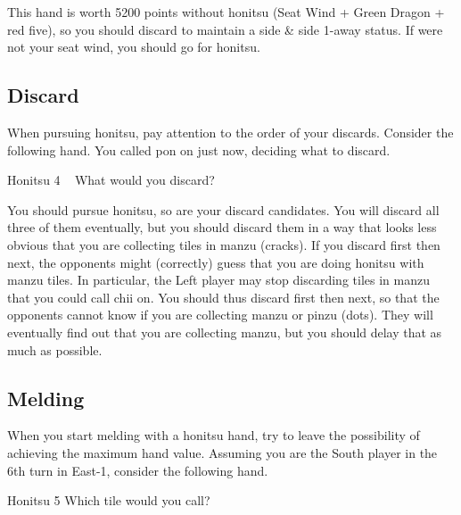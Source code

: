 \bigskip
\noindent This hand is worth 5200 points without {\jap honitsu} (Seat Wind + Green Dragon + red five), so you should discard {\LARGE{}} to maintain a side \& side 1-away status. If {\LARGE\nan} were not your seat wind, you should go for {\jap honitsu}.

\newpage
\subsection{Discard}
When pursuing {\jap honitsu}, pay attention to the order of your discards. 
Consider the following hand. You called {\jap pon} on {\LARGE\bai} just now, deciding what to discard. 
\begin{itembox}[r]{{\jap Honitsu} 4}
\bp
{}\bei\bei\zhong~\bai\bai\rbai
\ep
\vspace{-10pt}What would you discard? \vspace{-5pt}
\end{itembox}

\bigskip
\noindent You should pursue {\jap honitsu}, so {\LARGE{}} are your discard candidates. You will discard all three of them eventually, but you should discard them in a way that looks less obvious that you are collecting tiles in {\jap manzu} (cracks). 
If you discard {\LARGE{}} first then {\LARGE{}} next, the opponents might (correctly) guess that you are doing {\jap honitsu} with {\jap manzu} tiles. 
In particular, the Left player may stop discarding tiles in {\jap manzu} that you could call {\jap chii} on. You should thus discard {\LARGE{}} first then {\LARGE{}} next, so that the opponents cannot know if you are collecting {\jap manzu} or {\jap pinzu} (dots). They will eventually find out that you are collecting {\jap manzu}, but you should delay that as much as possible. 

\newpage
\subsection{Melding}
When you start melding with a {\jap honitsu} hand, try to leave the possibility of achieving the maximum hand value. Assuming you are the South player in the 6th turn in East-1, consider the following hand.

\begin{itembox}[r]{{\jap Honitsu} 5}
\bp
{}\xi\bei\bei\fa\fa
\ep
\vspace{-10pt}Which tile would you call? \vspace{-5pt}
\end{itembox}

